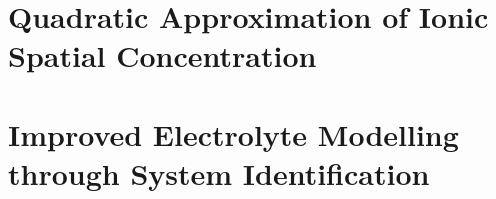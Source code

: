 \section{Quadratic Approximation of Ionic Spatial Concentration}\label{sec:quadraticapprox}


\section{Improved Electrolyte Modelling through System Identification}\label{sec:newelectrolytemodel}


